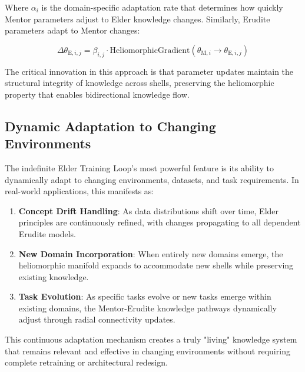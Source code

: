 Where $\alpha_i$ is the domain-specific adaptation rate that determines how quickly Mentor parameters adjust to Elder knowledge changes. Similarly, Erudite parameters adapt to Mentor changes:

\begin{equation}
\Delta \theta_{\text{E},i,j} = \beta_{i,j} \cdot \text{HeliomorphicGradient}(\theta_{\text{M},i} \rightarrow \theta_{\text{E},i,j})
\end{equation}

The critical innovation in this approach is that parameter updates maintain the structural integrity of knowledge across shells, preserving the heliomorphic property that enables bidirectional knowledge flow.

\subsection{Dynamic Adaptation to Changing Environments}

The indefinite Elder Training Loop's most powerful feature is its ability to dynamically adapt to changing environments, datasets, and task requirements. In real-world applications, this manifests as:

\begin{enumerate}
    \item \textbf{Concept Drift Handling}: As data distributions shift over time, Elder principles are continuously refined, with changes propagating to all dependent Erudite models.
    
    \item \textbf{New Domain Incorporation}: When entirely new domains emerge, the heliomorphic manifold expands to accommodate new shells while preserving existing knowledge.
    
    \item \textbf{Task Evolution}: As specific tasks evolve or new tasks emerge within existing domains, the Mentor-Erudite knowledge pathways dynamically adjust through radial connectivity updates.
\end{enumerate}

This continuous adaptation mechanism creates a truly "living" knowledge system that remains relevant and effective in changing environments without requiring complete retraining or architectural redesign.